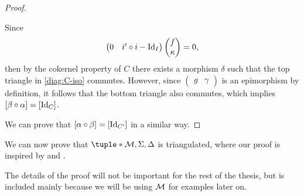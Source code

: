 \begin{proof}
\begin{diagramlabel}[\label{diag:C-iso}]
    \end{diagramlabel}

    Since
    \[
        \begin{pmatrix}
            0 & i' \circ i - \operatorname{Id}_I
        \end{pmatrix}
        \begin{pmatrix}
            f \\
            \kappa
        \end{pmatrix}
        = 0,
    \]
    then by the cokernel property of \( C \) there exists a morphism \( \delta \) such that the top triangle in \autoref{diag:C-iso} commutes. However, since \( 
        \begin{pmatrix}
            g & \gamma
        \end{pmatrix}
    \) is an epimorphism by definition, it follows that the bottom triangle also commutes, which implies \( [\beta \circ \alpha] = [\operatorname{Id}_C] \).

    We can prove that \( [\alpha \circ \beta] = [\operatorname{Id}_{C'}] \) in a similar way.
\end{proof}

We can now prove that \( \tuple*{\Mc, \Sigma, \Delta} \) is triangulated, where our proof is inspired by \cite[p.\ 16]{Happel_1988} and \cite[Theorem 4.18]{Johan_Bachelor}.

The details of the proof will not be important for the rest of the thesis, but is included mainly because we will be using \( {\mathcal{M}} \) for examples later on.

